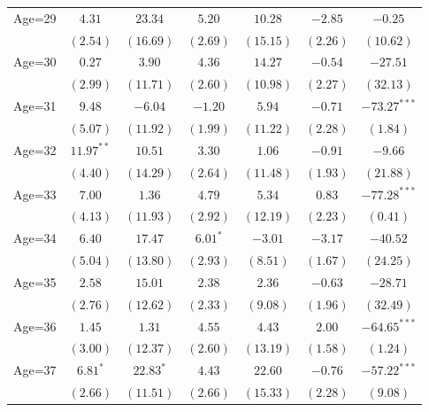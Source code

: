 \documentclass[fullpage]{paper}
\begin{document}
\begin{center}
\begin{longtable}{l c c c c c c }
Age=29      & $4.31$       & $23.34$      & $5.20$       & $10.28$       & $-2.85$       & $-0.25$        \\
            & $(2.54)$     & $(16.69)$    & $(2.69)$     & $(15.15)$     & $(2.26)$      & $(10.62)$      \\
Age=30      & $0.27$       & $3.90$       & $4.36$       & $14.27$       & $-0.54$       & $-27.51$       \\
            & $(2.99)$     & $(11.71)$    & $(2.60)$     & $(10.98)$     & $(2.27)$      & $(32.13)$      \\
Age=31      & $9.48$       & $-6.04$      & $-1.20$      & $5.94$        & $-0.71$       & $-73.27^{***}$ \\
            & $(5.07)$     & $(11.92)$    & $(1.99)$     & $(11.22)$     & $(2.28)$      & $(1.84)$       \\
Age=32      & $11.97^{**}$ & $10.51$      & $3.30$       & $1.06$        & $-0.91$       & $-9.66$        \\
            & $(4.40)$     & $(14.29)$    & $(2.64)$     & $(11.48)$     & $(1.93)$      & $(21.88)$      \\
Age=33      & $7.00$       & $1.36$       & $4.79$       & $5.34$        & $0.83$        & $-77.28^{***}$ \\
            & $(4.13)$     & $(11.93)$    & $(2.92)$     & $(12.19)$     & $(2.23)$      & $(0.41)$       \\
Age=34      & $6.40$       & $17.47$      & $6.01^{*}$   & $-3.01$       & $-3.17$       & $-40.52$       \\
            & $(5.04)$     & $(13.80)$    & $(2.93)$     & $(8.51)$      & $(1.67)$      & $(24.25)$      \\
Age=35      & $2.58$       & $15.01$      & $2.38$       & $2.36$        & $-0.63$       & $-28.71$       \\
            & $(2.76)$     & $(12.62)$    & $(2.33)$     & $(9.08)$      & $(1.96)$      & $(32.49)$      \\
Age=36      & $1.45$       & $1.31$       & $4.55$       & $4.43$        & $2.00$        & $-64.65^{***}$ \\
            & $(3.00)$     & $(12.37)$    & $(2.60)$     & $(13.19)$     & $(1.58)$      & $(1.24)$       \\
Age=37      & $6.81^{*}$   & $22.83^{*}$  & $4.43$       & $22.60$       & $-0.76$       & $-57.22^{***}$ \\
            & $(2.66)$     & $(11.51)$    & $(2.66)$     & $(15.33)$     & $(2.28)$      & $(9.08)$       \\

\end{longtable}
\end{center}
\end{document}
